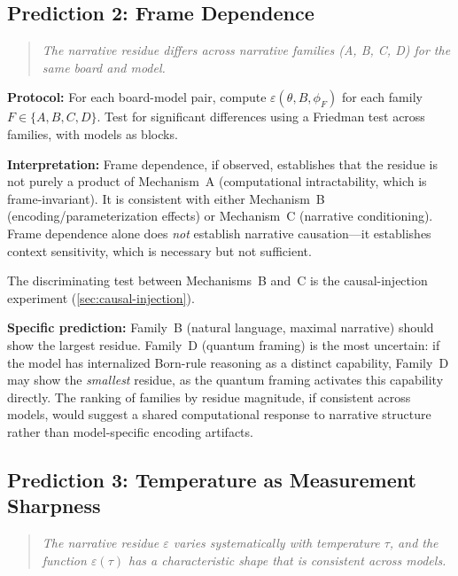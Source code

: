 \documentclass[12pt,a4paper]{article}
\theoremstyle{definition}
\theoremstyle{remark}
\begin{document}
\subsection{Prediction 2: Frame Dependence}
\label{sec:pred2}

\begin{quote}
  \textit{The narrative residue differs across narrative families
  (A, B, C, D) for the same board and model.}
\end{quote}

\textbf{Protocol:}  For each board-model pair, compute
$\varepsilon(\theta, B, \phi_F)$ for each family $F \in \{A,B,C,D\}$.
Test for significant differences using a Friedman test across families,
with models as blocks.

\textbf{Interpretation:}  Frame dependence, if observed, establishes
that the residue is not purely a product of Mechanism~A
(computational intractability, which is frame-invariant).  It is
consistent with either Mechanism~B (encoding/parameterization
effects) or Mechanism~C (narrative conditioning).  Frame dependence
alone does \emph{not} establish narrative causation---it establishes
context sensitivity, which is necessary but not sufficient.

The discriminating test between Mechanisms~B and~C is the
causal-injection experiment (\cref{sec:causal-injection}).

\textbf{Specific prediction:}  Family~B (natural language, maximal
narrative) should show the largest residue.  Family~D (quantum
framing) is the most uncertain: if the model has internalized
Born-rule reasoning as a distinct capability, Family~D may show the
\emph{smallest} residue, as the quantum framing activates this
capability directly.  The ranking of families by residue magnitude,
if consistent across models, would suggest a shared computational
response to narrative structure rather than model-specific encoding
artifacts.

\subsection{Prediction 3: Temperature as Measurement Sharpness}
\label{sec:pred3}

\begin{quote}
  \textit{The narrative residue $\varepsilon$ varies systematically
  with temperature $\tau$, and the function
  $\varepsilon(\tau)$ has a characteristic shape that is
  consistent across models.}
\end{quote}
\end{document}
